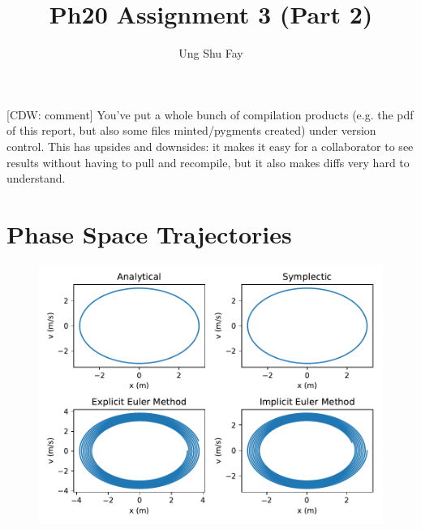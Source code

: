 \documentclass{article}
\title{Ph20 Assignment 3 (Part 2)
\\\cdw{PASS}}
\author{Ung Shu Fay}
\newcommand{\cdw}[1]
           {{\color{blue} [CDW: comment] #1}}
\begin{document}
\maketitle

\cdw{You've put a whole bunch of compilation products (e.g. the pdf of this report, but also some files minted/pygments created) under version control. This has upsides and downsides: it makes it easy for a collaborator to see results without having to pull and recompile, but it also makes diffs very hard to understand.}

\section{Phase Space Trajectories}
    \begin{figure}[h!]
        \centering
        \includegraphics[scale=0.8]{phase_space.pdf}
        \label{phase}
    \end{figure}

    
\end{document}
